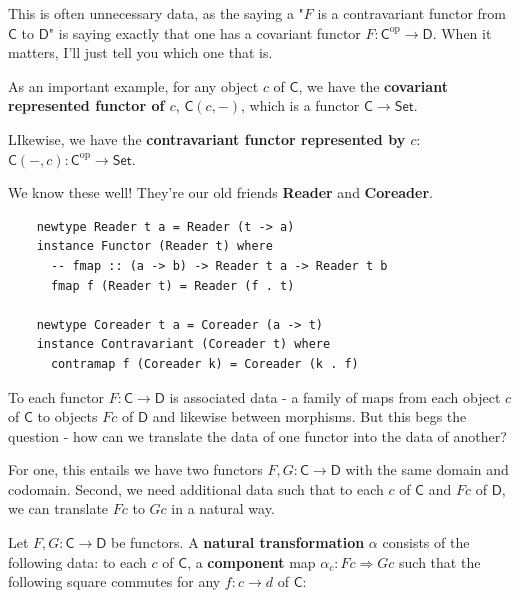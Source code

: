 \documentclass[tikz]{beamer}
\newcommand{\cat}[1]{\bm{ \mathsf{#1} }}
\newcommand{\cc}{\cat{C}}
\newcommand{\dd}{\cat{D}}
\newcommand{\op}[1]{#1^{\text{op}}}
\newcommand{\opc}{\op{\cc}}
\theoremstyle{definition}
\begin{document}
\frame
{
	This is often unnecessary data, as the saying a "$F$ is a contravariant functor from $\cc$ to $\dd$" is saying exactly that one has a covariant functor $F : \opc \to \dd$. When it matters, I'll just tell you which one that is.

}

\frame
{
	As an important example, for any object $c$ of $\cc$, we have the \textbf{covariant represented functor of $c$}, $\cc(c, -)$, which is a functor $\cc \to \cat{Set}$.
	
}

\frame
{

 LIkewise, we have the \textbf{contravariant functor represented by $c$}: $\cc(-, c) : \opc \to \cat{Set}$.

}

\frame
{
	We know these well! They're our old friends \textbf{Reader} and \textbf{Coreader}.
}

\begin{frame}[fragile]

	\begin{verbatim}
	newtype Reader t a = Reader (t -> a)
	instance Functor (Reader t) where
	  -- fmap :: (a -> b) -> Reader t a -> Reader t b
	  fmap f (Reader t) = Reader (f . t)
	  
	newtype Coreader t a = Coreader (a -> t)
	instance Contravariant (Coreader t) where
	  contramap f (Coreader k) = Coreader (k . f)
	\end{verbatim}
\end{frame}

\frame
{
	To each functor $F : \cc \to \dd$ is associated data - a family of maps from each object $c$ of $\cc$ to objects $Fc$ of $\dd$ and likewise between morphisms. But this begs the question - how can we translate the data of one functor into the data of another?  
}

\frame
{
	For one, this entails we have two functors $F, G : \cc \to \dd$ with the same domain and codomain. Second, we need additional data such that to each $c$ of $\cc$ and $Fc$ of $\dd$, we can translate $Fc$ to $Gc$ in a natural way. 
}


\begin{frame}[fragile]

	\begin{definition}
		Let $F,G : \cc \to \dd$ be functors. A \textbf{natural transformation} $\alpha$ consists of the following data: to each $c$ of $\cc$, a \textbf{component} map $\alpha_c : Fc \Rightarrow Gc$ such that the following square commutes for any $f : c \to d$ of $\cc$: 
		
		\begin{center}
		\end{center}
	\end{definition}
\end{frame}
\end{document}
